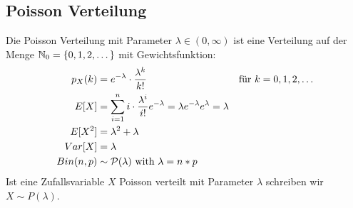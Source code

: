 \subsection*{Poisson Verteilung}
Die Poisson Verteilung mit Parameter $\lambda \in (0, \infty)$ ist eine
Verteilung auf der Menge $\mathbb{N}_0 = \{0, 1, 2, \dots\}$ mit Gewichtsfunktion:
\begin{align*}
  p_X (k) & = e^{-\lambda} \cdot \frac{\lambda^k}{k!}
          &                                                                                            & \text{für } k = 0, 1, 2, \dots \\
  E[X]    & = \sum_{i = 1}^n i \cdot \frac{\lambda^i}{i!} e^{-\lambda} = \lambda e^{-\lambda} e^\lambda = \lambda                                  \\
  E[X^2]  & = \lambda^2 + \lambda                                                                                                       \\
  Var[X]  & = \lambda \\
  Bin(n, p) & \sim \mathcal{P}(\lambda) \text{ with } \lambda = n * p
\end{align*}
Ist eine Zufallsvariable $X$ Poisson verteilt mit Parameter $\lambda$
schreiben wir $X \sim P (\lambda)$.